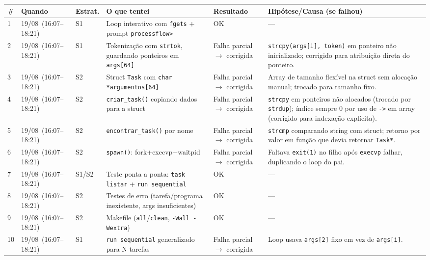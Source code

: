 \documentclass[11pt,a4paper]{article}
\begin{document}
\begin{longtable}{L{0.5cm} L{2.6cm} L{1.1cm} L{3.4cm} L{2.3cm} L{6.2cm}}
\toprule
\textbf{\#} & \textbf{Quando} & \textbf{Estrat.} & \textbf{O que tentei} & \textbf{Resultado} & \textbf{Hipótese/\allowbreak Causa (se falhou)} \\
\midrule
{} & 19/08\allowbreak\ (16:07--18:21) & S1 & Loop interativo com \texttt{fgets} + prompt \texttt{processflow>} & OK & --- \\
2 & 19/08\allowbreak\ (16:07--18:21) & S1 & Tokenização com \texttt{strtok}, guardando ponteiros em \texttt{args[64]} & Falha parcial $\to$ corrigida & \texttt{strcpy(args[i], token)} em ponteiro não inicializado; corrigido para atribuição direta do ponteiro. \\
3 & 19/08\allowbreak\ (16:07--18:21) & S2 & Struct \texttt{Task} com \texttt{char *argumentos[64]} & Falha parcial $\to$ corrigida & Array de tamanho flexível na struct sem alocação manual; trocado para tamanho fixo. \\
4 & 19/08\allowbreak\ (16:07--18:21) & S2 & \texttt{criar\_task()} copiando dados para a struct & Falha parcial $\to$ corrigida & \texttt{strcpy} em ponteiros não alocados (trocado por \texttt{strdup}); índice sempre 0 por uso de \texttt{->} em array (corrigido para indexação explícita). \\
5 & 19/08\allowbreak\ (16:07--18:21) & S2 & \texttt{encontrar\_task()} por nome & Falha parcial $\to$ corrigida & \texttt{strcmp} comparando string com struct; retorno por valor em função que devia retornar \texttt{Task*}. \\
6 & 19/08\allowbreak\ (16:07--18:21) & S2 & \texttt{spawn()}: fork+execvp+waitpid & Falha parcial $\to$ corrigida & Faltava \texttt{exit(1)} no filho após \texttt{execvp} falhar, duplicando o loop do pai. \\
7 & 19/08\allowbreak\ (16:07--18:21) & S1/S2 & Teste ponta a ponta: \texttt{task listar} + \texttt{run sequential} & OK & --- \\
8 & 19/08\allowbreak\ (16:07--18:21) & S2 & Testes de erro (tarefa/programa inexistente, args insuficientes) & OK & --- \\
9 & 19/08\allowbreak\ (16:07--18:21) & S2 & Makefile (\texttt{all}/\texttt{clean}, \texttt{-Wall -Wextra}) & OK & --- \\
10 & 19/08\allowbreak\ (16:07--18:21) & S1 & \texttt{run sequential} generalizado para N tarefas & Falha parcial $\to$ corrigida & Loop usava \texttt{args[2]} fixo em vez de \texttt{args[i]}. \\

\end{longtable}
\end{document}
